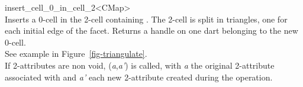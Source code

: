 \begin{ccRefFunction}{insert_cell_0_in_cell_2<CMap>}
\\

{Inserts a 0-cell in the 2-cell containing .
  The 2-cell is split in triangles, one for each initial edge of the facet.
  Returns a handle on one dart belonging to the new 0-cell.
 \\
  See example in Figure~\ref{fig-triangulate}.\\
    If 2-attributes are non void, 
    (\emph{a},\emph{a'}) is called, with \emph{a} the original 2-attribute associated
    with  and \emph{a'} each new 2-attribute created during the operation.
}

\ccSeeAlso
{}\\
\\
\\
\\
\\
\end{ccRefFunction}

